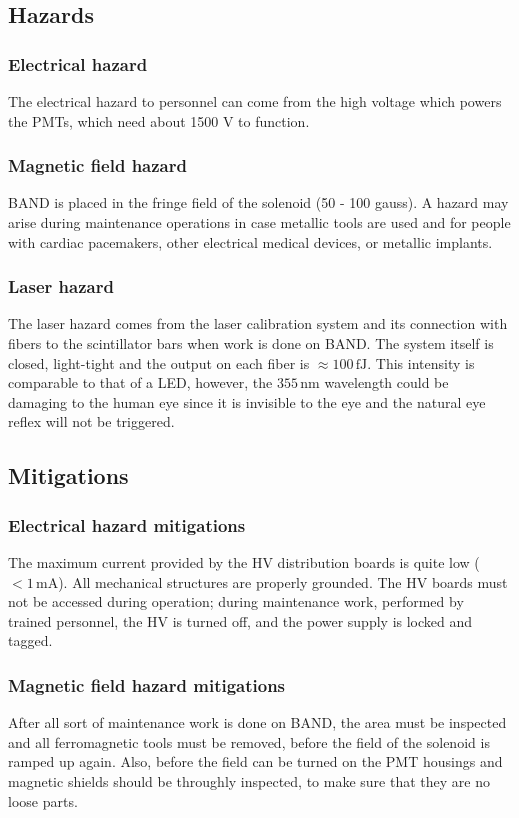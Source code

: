\subsection{Hazards} 
\indent
\subsubsection{Electrical hazard}
The electrical hazard to personnel can come from the high voltage which powers the PMTs, which need about 1500 V to function. 

\subsubsection{Magnetic field hazard}
BAND is placed in the fringe field of the solenoid (50 - 100 gauss). A hazard may arise during maintenance operations in case metallic tools are used and for people with cardiac pacemakers, other electrical medical devices, or metallic implants.

\subsubsection{Laser hazard}
The laser hazard comes from the laser calibration system and its connection with fibers to the scintillator bars when work is done on BAND. The system itself is closed, light-tight and the output on each fiber is $\approx100\,\mathrm{fJ}$. This intensity is comparable to that of a LED, however, the $355\,\mathrm{nm}$ wavelength could be damaging to the human eye since it is invisible to the eye and the natural eye reflex will not be triggered. 

\subsection{Mitigations}
\indent
\subsubsection{Electrical hazard mitigations} 
The maximum current provided by the HV distribution boards is quite low ($<1\,\mathrm{mA}$). All mechanical structures are properly grounded. The HV boards must not be accessed during operation; during maintenance work, performed by trained personnel, the HV is turned off, and the power supply is locked and tagged.
\subsubsection{Magnetic field hazard mitigations}
After all sort of maintenance work is done on BAND, the area must be inspected and all ferromagnetic tools must be removed, before the field of the solenoid is ramped up again. Also, before the field can be turned on the PMT housings and magnetic shields should be throughly inspected, to make sure that they are no loose parts. 
